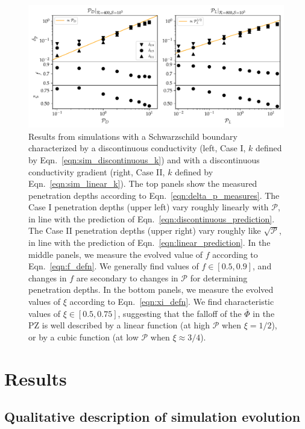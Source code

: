 \documentclass[twocolumn]{aastex631}
\newcommand{\mP}{\ensuremath{\mathcal{P}}}
\renewcommand{\bar}[1]{\overline{#1}}
\begin{document}
\begin{figure}[t]
\centering
\includegraphics[width=\textwidth]{parameters_vs_p.pdf}
\caption{
Results from simulations with a Schwarzschild boundary characterized by a discontinuous conductivity (left, Case I, $k$ defined by Eqn.~\ref{eqn:sim_discontinuous_k}) and with a discontinuous conductivity gradient (right, Case II, $k$ defined by Eqn.~\ref{eqn:sim_linear_k}).
The top panels show the measured penetration depths according to Eqn.~\ref{eqn:delta_p_measures}.
The Case I penetration depths (upper left) vary roughly linearly with $\mP$, in line with the prediction of Eqn.~\ref{eqn:discontinuous_prediction}.
The Case II penetration depths (upper right) vary roughly like $\sqrt{\mP}$, in line with the prediction of Eqn.~\ref{eqn:linear_prediction}.
In the middle panels, we measure the evolved value of $f$ according to Eqn.~\ref{eqn:f_defn}.
We generally find values of $f \in [0.5, 0.9]$, and changes in $f$ are secondary to changes in $\mP$ for determining penetration depths.
In the bottom panels, we measure the evolved values of $\xi$ according to Eqn.~\ref{eqn:xi_defn}.
We find characteristic values of $\xi \in [0.5, 0.75]$, suggesting that the falloff of the $\bar{\Phi}$ in the PZ is well described by a linear function (at high $\mP$ when $\xi = 1/2$), or by a cubic function (at low $\mP$ when $\xi \approx 3/4$).
\label{fig:parameters_vs_p}
}
\end{figure}





\section{Results}
\label{sec:results}

\subsection{Qualitative description of simulation evolution}
\end{document}
